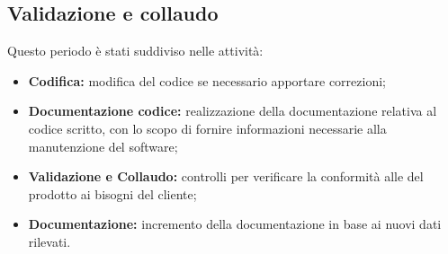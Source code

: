 \subsection{Validazione e collaudo}
Questo periodo è stati suddiviso nelle attività:
\begin{itemize}
	\item \textbf{Codifica:} modifica del codice se necessario apportare correzioni;
	\item \textbf{Documentazione codice:} realizzazione della documentazione relativa al codice scritto, con lo scopo di fornire informazioni necessarie alla manutenzione del software;
	\item \textbf{Validazione e Collaudo:} controlli per verificare la conformità alle del prodotto ai bisogni del cliente;
	\item \textbf{Documentazione:} incremento della documentazione in base ai nuovi dati rilevati.
\end{itemize}
